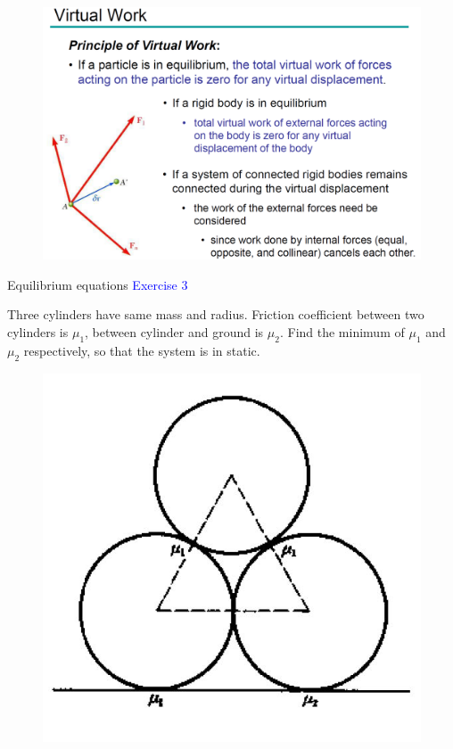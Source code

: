 \documentclass{beamer}
\begin{document}
\begin{frame}
  \begin{figure}[htbp]
  \centering
  \includegraphics[width=0.9 \linewidth, angle =0]{virtual_work3.png}
  \label{fig:v3}
  \end{figure}
\end{frame}

\begin{frame}{Equilibrium equations}
\textcolor{blue}{Exercise 3}

Three cylinders have same mass and radius. Friction coefficient between two cylinders is $\mu_1$, between cylinder and ground is $\mu_2$.
Find the minimum of $\mu_1$ and $\mu_2$ respectively, so that the system is in static.
\begin{figure}[htbp]
\centering
\includegraphics[width=0.4 \linewidth, angle =0]{ex3.png}
\label{fig:3}
\end{figure}
\end{frame}
\end{document}
